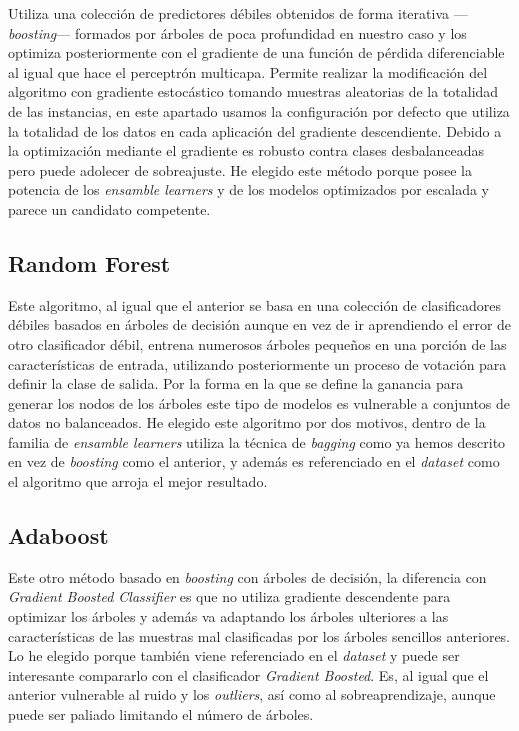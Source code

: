 \documentclass{article}
\newcommand{\img}[2]{
\noindent\makebox[\textwidth][c]{\texttt{[image: \#1]}}%
}
\begin{document}
Utiliza una colección de predictores débiles obtenidos de forma iterativa ---\textit{boosting}--- formados por árboles de poca profundidad en nuestro caso y los optimiza posteriormente con el gradiente de una función de pérdida diferenciable al igual que hace el perceptrón multicapa. Permite realizar la modificación del algoritmo con gradiente estocástico tomando muestras aleatorias de la totalidad de las instancias, en este apartado usamos la configuración por defecto que utiliza la totalidad de los datos en cada aplicación del gradiente descendiente. Debido a la optimización mediante el gradiente es robusto contra clases desbalanceadas pero puede adolecer de sobreajuste. He elegido este método porque posee la potencia de los \textit{ensamble learners} y de los modelos optimizados por escalada y parece un candidato competente.

\img{gradboost}{0.5}

\subsection{Random Forest}

Este algoritmo, al igual que el anterior se basa en una colección de clasificadores débiles basados en árboles de decisión aunque en vez de ir aprendiendo el error de otro clasificador débil, entrena numerosos árboles pequeños en una porción de las características de entrada, utilizando posteriormente un proceso de votación para definir la clase de salida. Por la forma en la que se define la ganancia para generar los nodos de los árboles este tipo de modelos es vulnerable a conjuntos de datos no balanceados. He elegido este algoritmo por dos motivos, dentro de la familia de \textit{ensamble learners} utiliza la técnica de \textit{bagging} como ya hemos descrito en vez de \textit{boosting} como el anterior, y además es referenciado en el \textit{dataset} como el algoritmo que arroja el mejor resultado.

\img{randfor}{0.5}

\subsection{Adaboost}

Este otro método basado en \textit{boosting} con árboles de decisión, la diferencia con \textit{Gradient Boosted Classifier} es que no utiliza gradiente descendente para optimizar los árboles y además va adaptando los árboles ulteriores a las características de las muestras mal clasificadas por los árboles sencillos anteriores. Lo he elegido porque también viene referenciado en el \textit{dataset} y puede ser interesante compararlo con el clasificador \textit{Gradient Boosted}. Es, al igual que el anterior vulnerable al ruido y los \textit{outliers}, así como al sobreaprendizaje, aunque puede ser paliado limitando el número de árboles.
\end{document}
